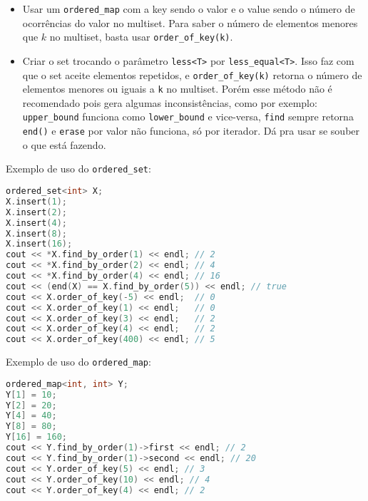 \documentclass[10pt, a4paper, oneside]{book}
\begin{document}
\begin{itemize}
\item Usar um \texttt{ordered\_map} com a key sendo o valor e o value sendo o número de ocorrências do valor no multiset. Para saber o número de elementos menores que $k$ no multiset, basta usar \texttt{order\_of\_key(k)}.
\end{itemize}



\begin{itemize}
\item Criar o set trocando o parâmetro \texttt{less<T>} por \texttt{less\_equal<T>}. Isso faz com que o set aceite elementos repetidos, e \texttt{order\_of\_key(k)} retorna o número de elementos menores ou iguais a \texttt{k} no multiset. Porém esse método não é recomendado pois gera algumas inconsistências, como por exemplo: \texttt{upper\_bound} funciona como \texttt{lower\_bound} e vice-versa, \texttt{find} sempre retorna \texttt{end()} e \texttt{erase} por valor não funciona, só por iterador. Dá pra usar se souber o que está fazendo.
\end{itemize}



Exemplo de uso do \texttt{ordered\_set}:



\begin{lstlisting}[language=C++]
ordered_set<int> X;
X.insert(1);
X.insert(2);
X.insert(4);
X.insert(8);
X.insert(16);
cout << *X.find_by_order(1) << endl; // 2
cout << *X.find_by_order(2) << endl; // 4
cout << *X.find_by_order(4) << endl; // 16
cout << (end(X) == X.find_by_order(5)) << endl; // true
cout << X.order_of_key(-5) << endl;  // 0
cout << X.order_of_key(1) << endl;   // 0
cout << X.order_of_key(3) << endl;   // 2
cout << X.order_of_key(4) << endl;   // 2
cout << X.order_of_key(400) << endl; // 5
\end{lstlisting}



Exemplo de uso do \texttt{ordered\_map}:



\begin{lstlisting}[language=C++]
ordered_map<int, int> Y;
Y[1] = 10;
Y[2] = 20;
Y[4] = 40;
Y[8] = 80;
Y[16] = 160;
cout << Y.find_by_order(1)->first << endl; // 2
cout << Y.find_by_order(1)->second << endl; // 20
cout << Y.order_of_key(5) << endl; // 3
cout << Y.order_of_key(10) << endl; // 4
cout << Y.order_of_key(4) << endl; // 2
\end{lstlisting}
\end{document}
